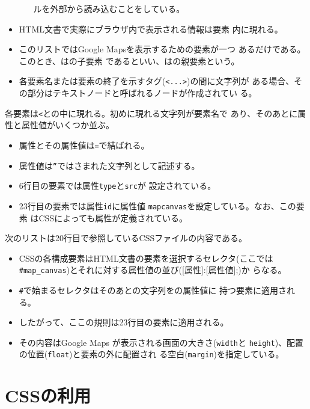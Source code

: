 \begin{Exec}
\begin{itemize}
\begin{itemize}
		ルを外部から読み込むことをしている。
	 \end{itemize}
 \item HTML文書で実際にブラウザ内で表示される情報は要素
       内に現れる。
 \item このリストではGoogle Mapsを表示するための要素が一つ
       あるだけである。このとき、はの子要素
       であるといい、はの親要素という。
 \item 各要素名または要素の終了を示すタグ(\texttt{<...>})の間に文字列が
       ある場合、その部分はテキストノードと呼ばれるノードが作成されてい
       る。
\end{itemize}
各要素は\texttt{<}と\texttt{}の中に現れる。初めに現れる文字列が要素名で
 あり、そのあとに属性と属性値がいくつか並ぶ。
\begin{itemize}
 \item 属性とその属性値は\texttt{=}で結ばれる。
 \item 属性値は\texttt{”}ではさまれた文字列として記述する。
 \item 6行目の要素では属性\texttt{type}と\texttt{src}が
       設定されている。
 \item 23行目の要素では属性\texttt{id}に属性値
       \texttt{map\textunderscore canvas}を設定している。なお、この要素
       はCSSによっても属性が定義されている。
\end{itemize}
次のリストは20行目で参照しているCSSファイルの内容である。
\begin{itemize}
 \item CSSの各構成要素はHTML文書の要素を選択するセレクタ(ここでは
       \Verb+#map_canvas+)とそれに対する属性値の並び([属性]:[属性値];)か
       らなる。
 \item \Verb+#+で始まるセレクタはそのあとの文字列をの属性値に
       持つ要素に適用される。
 \item したがって、ここの規則は23行目の要素に適用される。
 \item その内容はGoogle Maps が表示される画面の大きさ(\texttt{width}と
       \texttt{height})、配置の位置(\texttt{float})と要素の外に配置され
       る空白(\texttt{margin})を指定している。
\end{itemize}
\end{Exec}
\section{CSSの利用}


